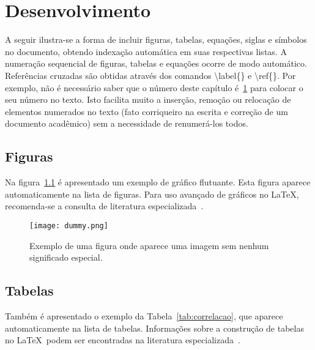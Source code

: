 \chapter{Desenvolvimento}
\label{chap:desenv}

A seguir ilustra-se a forma de incluir figuras, tabelas, equa\c{c}\~oes, siglas e s\'imbolos no documento, obtendo indexa\c{c}\~ao autom\'atica em suas respectivas listas. A numera\c{c}\~ao sequencial de figuras, tabelas e equa\c{c}\~oes ocorre de modo autom\'atico. Refer\^encias cruzadas s\~ao obtidas atrav\'es dos comandos {\ttfamily \textbackslash label\{\}} e {\ttfamily \textbackslash ref\{\}}. Por exemplo, n\~ao \'e necess\'ario saber que o n\'umero deste cap\'itulo \'e~\ref{chap:desenv} para colocar o seu n\'umero no texto. Isto facilita muito a inser\c{c}\~ao, remo\c{c}\~ao ou reloca\c{c}\~ao de elementos numerados no texto (fato corriqueiro na escrita e corre\c{c}\~ao de um documento acad\^emico) sem a necessidade de renumer\'a-los todos.

\section{Figuras}

Na figura~\ref{fig:dummy} \'e apresentado um exemplo de gr\'afico flutuante. Esta figura aparece automaticamente na lista de figuras. Para uso avan\c{c}ado de gr\'aficos no \LaTeX, recomenda-se a consulta de literatura especializada~\cite{Goossens2007}.

\begin{figure}[!htb]
	\centering
	\caption[Exemplo de uma figura]{Exemplo de uma figura onde aparece uma imagem sem nenhum significado especial.}
	\texttt{[image: dummy.png]} %
	\label{fig:dummy}
\end{figure}

\section{Tabelas}

Tamb\'em \'e apresentado o exemplo da Tabela~\ref{tab:correlacao}, que aparece automaticamente na lista de tabelas. Informa\c{c}\~oes sobre a constru\c{c}\~ao de tabelas no \LaTeX\ podem ser encontradas na literatura especializada~\cite{Lamport1986,Buerger1989,Kopka2003,Mittelbach2004}.


